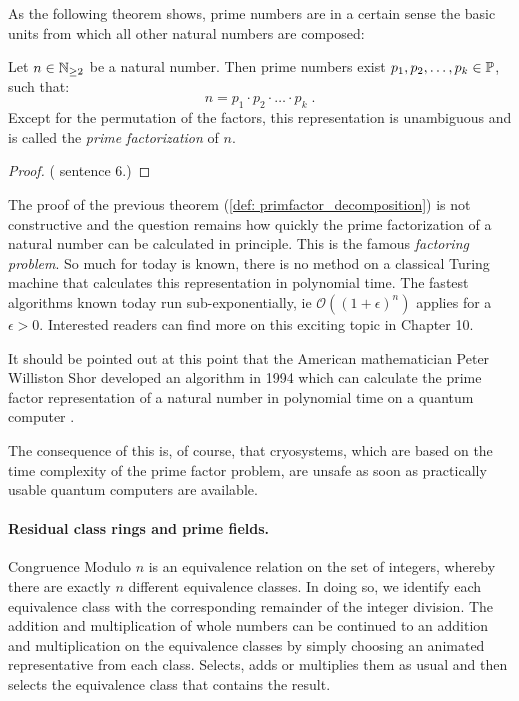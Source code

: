 As the following theorem shows, prime numbers are in a certain sense the basic units from which all other natural numbers are composed:
\begin{theorem}
\label{def: primfactor_decomposition}
Let $ n \in \mathbb{N}_{\geq 2} $ be a natural number. Then prime numbers exist
$ p_1, p_2, \ldots, p_k \in \mathbb{P} $, such that:
\begin{equation}
n = p_1 \cdot p_2 \cdot \ldots \cdot p_k \;.
\end{equation}
Except for the permutation of the factors, this representation is unambiguous and is called the \textit{prime factorization} of $ n $.
\end{theorem}
\begin{proof} (\cite{AL} sentence 6.) 
\end{proof}
\begin{remark}
The proof of the previous theorem (\ref{def: primfactor_decomposition}) is not constructive and the question remains how quickly the prime factorization of a natural number can be calculated in principle. This is the famous \textit{factoring problem}. So much for today is known, there is no method on a classical Turing machine that calculates this representation in polynomial time. The fastest algorithms known today run sub-exponentially, ie $\mathcal{O}((1+ \epsilon)^n)$ applies for a $ \epsilon> 0 $. Interested readers can find more on this exciting topic in \cite{JB} Chapter 10.
\end{remark}
\begin{remark}
It should be pointed out at this point that the American mathematician Peter Williston Shor developed an algorithm in 1994 which can calculate the prime factor representation of a natural number in polynomial time on a quantum computer \cite{PS}.

The consequence of this is, of course, that cryosystems, which are based on the time complexity of the prime factor problem, are unsafe as soon as practically usable quantum computers are available.
\end{remark} 



\paragraph{Residual class rings and prime fields.}
Congruence Modulo $ n $ is an equivalence relation on the set of integers, whereby there are exactly $ n $ different equivalence classes. In doing so, we identify each equivalence class with the corresponding remainder of the integer division. The addition and multiplication of whole numbers can be continued to an addition and multiplication on the equivalence classes by simply choosing an animated representative from each class. Selects, adds or multiplies them as usual and then selects the equivalence class that contains the result.

